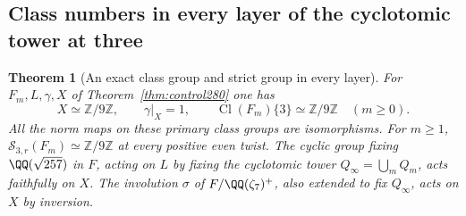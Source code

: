 \documentclass[a4paper,11pt]{article}
\newtheorem{theorem}[proposition]{Theorem}
\theoremstyle{definition}
\theoremstyle{remark}
\newcommand{\ZZ}{\mathbb Z}\newcommand{\ord}{\operatorname{ord}}
\numberwithin{equation}{section}
\newcommand{\Cl}{\operatorname{Cl}}
\begin{document}
\subsection{Class numbers in every layer of the cyclotomic tower at three}\label{nav:II-60}
\begin{theorem}[An exact class group and strict group in every layer]\leavevmode
\label{thm:tower280}
For \(F_m,L,\gamma,X\) of Theorem~\ref{thm:control280} one has
\[
     X\simeq\ZZ/9\ZZ,\qquad \gamma|_X=1,\qquad
     \Cl(F_m)\{3\}\simeq\ZZ/9\ZZ\quad(m\ge0).
\]
All the norm maps on these primary class groups are isomorphisms.
For \(m\ge1\), \(\mathcal S_{3,r}(F_m)\simeq\ZZ/9\ZZ\) at
every positive even twist. The cyclic group fixing
\(\QQ(\sqrt{257})\) in \(F\), acting on \(L\) by fixing the
cyclotomic tower \(Q_\infty=\bigcup_m Q_m\), acts faithfully on \(X\).
The involution \(\sigma\) of \(F/\QQ(\zeta_7)^+\), also
extended to fix \(Q_\infty\), acts on \(X\) by inversion.
\end{theorem}
\end{document}
